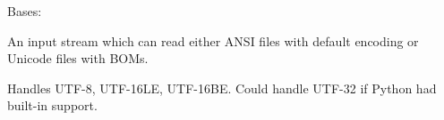\documentclass[a4paper,10pt,english]{sphinxmanual}
\begin{document}

\begin{fulllineitems}
\label{\detokenize{apidoc_src/src:src.pyconf.ConfigInputStream}}
Bases: 

An input stream which can read either ANSI files with default encoding
or Unicode files with BOMs.

Handles UTF-8, UTF-16LE, UTF-16BE. Could handle UTF-32 if Python had
built-in support.

\begin{fulllineitems}
\label{\detokenize{apidoc_src/src:src.pyconf.ConfigInputStream.close}}
\end{fulllineitems}


\begin{fulllineitems}
\label{\detokenize{apidoc_src/src:src.pyconf.ConfigInputStream.read}}
\end{fulllineitems}


\begin{fulllineitems}
\label{\detokenize{apidoc_src/src:src.pyconf.ConfigInputStream.readline}}
\end{fulllineitems}


\end{fulllineitems}

\end{document}
